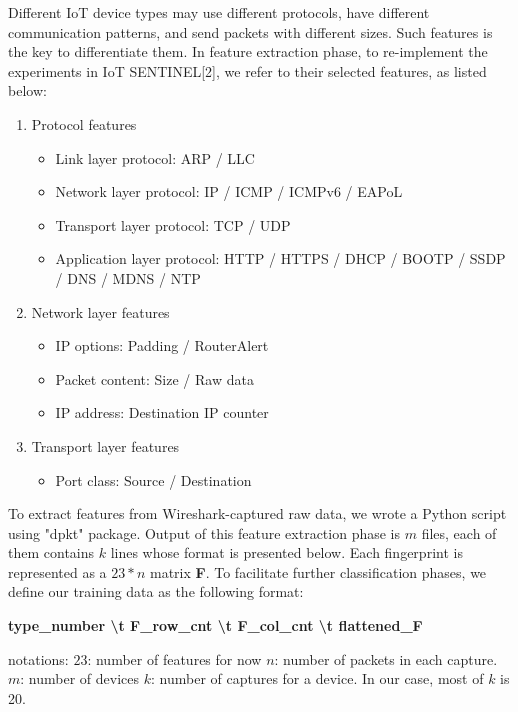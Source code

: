 \documentclass[twocolumn,10pt]{article}
\begin{document}
Different IoT device types may use different protocols, have different communication patterns, and send packets with different sizes. Such features is the key to differentiate them. In feature extraction phase, to re-implement the experiments in IoT SENTINEL[2], we refer to their selected features, as listed below:
\begin{enumerate}
  \item Protocol features
  \begin{itemize}
  \item Link layer protocol: ARP / LLC
  \item Network layer protocol: IP / ICMP / ICMPv6 / EAPoL
  \item Transport layer protocol: TCP / UDP
  \item Application layer protocol: HTTP / HTTPS / DHCP / BOOTP / SSDP / DNS / MDNS / NTP
  \end{itemize}
  \item Network layer features
  \begin{itemize}
  \item IP options: Padding / RouterAlert
  \item Packet content:  Size / Raw data
  \item IP address: Destination IP counter 
  \end{itemize}
  \item Transport layer features
  \begin{itemize}
  \item Port class: Source / Destination 
  \end{itemize}
\end{enumerate}

To extract features from Wireshark-captured raw data, we wrote a Python script using "dpkt" package. Output of this feature extraction phase is $m$ files, each of them contains $k$ lines whose format is presented below. Each fingerprint is represented as a $23*n$ matrix {\bf F}. To facilitate further classification phases, we define our training data as the following format:

{\bf type\_number \textbackslash t F\_row\_cnt \textbackslash t F\_col\_cnt \textbackslash t flattened\_F}

notations:
\newline $23$: number of features for now
\newline $n$: number of packets in each capture. 
\newline $m$: number of devices
\newline $k$: number of captures for a device. In our case, most of $k$ is 20.
\end{document}
